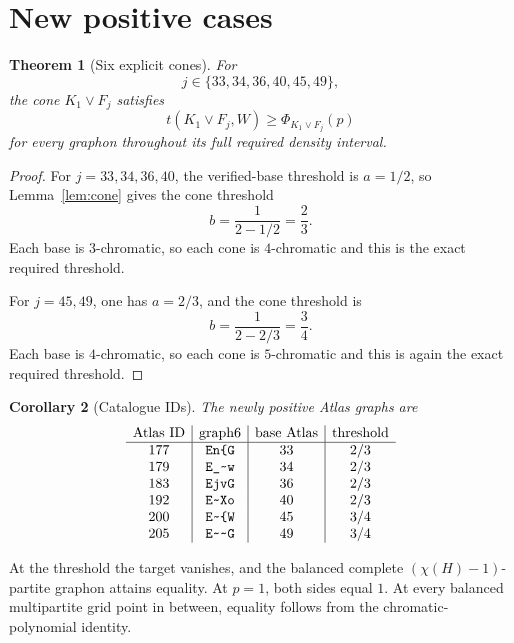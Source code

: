 \documentclass[11pt]{article}
\newtheorem{theorem}{Theorem}[section]
\newtheorem{corollary}[theorem]{Corollary}
\newcommand{\join}{\mathbin{\vee}}
\begin{document}
\section{New positive cases}

\begin{theorem}[Six explicit cones]
\label{thm:six}
For
\[
j\in\{33,34,36,40,45,49\},
\]
the cone $K_1\join F_j$ satisfies
\[
t(K_1\join F_j,W)\geq\Phi_{K_1\join F_j}(p)
\]
for every graphon throughout its full required density interval.
\end{theorem}

\begin{proof}
For $j=33,34,36,40$, the verified-base threshold is $a=1/2$, so
Lemma~\ref{lem:cone} gives the cone threshold
\[
b=\frac1{2-1/2}=\frac23.
\]
Each base is $3$-chromatic, so each cone is $4$-chromatic and this is
the exact required threshold.

For $j=45,49$, one has $a=2/3$, and the cone threshold is
\[
b=\frac1{2-2/3}=\frac34.
\]
Each base is $4$-chromatic, so each cone is $5$-chromatic and this is
again the exact required threshold.
\end{proof}

\begin{corollary}[Catalogue IDs]
The newly positive Atlas graphs are
\[
\begin{array}{c|c|c|c}
\text{Atlas ID}&\text{graph6}&\text{base Atlas}&\text{threshold}\\
\hline
177&\texttt{En\char123 G}&33&2/3\\
179&\texttt{E\_\char126 w}&34&2/3\\
183&\texttt{EjvG}&36&2/3\\
192&\texttt{E\char126 Xo}&40&2/3\\
200&\texttt{E\char126\char123 W}&45&3/4\\
205&\texttt{E\char126\char126 G}&49&3/4
\end{array}
\]
\end{corollary}

At the threshold the target vanishes, and the balanced complete
$(\chi(H)-1)$-partite graphon attains equality.  At $p=1$, both sides
equal $1$.  At every balanced multipartite grid point in between,
equality follows from the chromatic-polynomial identity.


\end{document}
